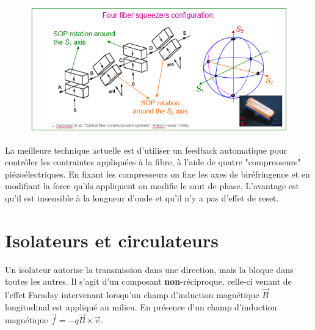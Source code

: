 	\begin{figure}
	\vspace{-5mm}
	\includegraphics[scale=0.6]{ch3/image5}
	\end{figure}
La meilleure technique actuelle est d'utiliser un feedback automatique pour contrôler les contraintes
appliquées à la fibre, à l'aide de quatre "compresseurs" piézoélectriques. En fixant les compresseurs
on fixe les axes de biréfringence et en modifiant la force qu'ils appliquent on modifie le saut
de phase. L'avantage est qu'il est insensible à la longueur d'onde et qu'il n'y a pas d'effet de
reset. 


\section{Isolateurs et circulateurs}
Un isolateur autorise la transmission dans une direction, mais la bloque dans toutes les autres. Il
s'agit d'un composant \textbf{non}-réciproque, celle-ci venant de l'effet Faraday intervenant
lorsqu'un champ d'induction magnétique $\vec{B}$ longitudinal est appliqué au milieu. En présence
d'un champ d'induction magnétique $\vec{f} = -q\vec{B}\times\vec{v}$.\\

